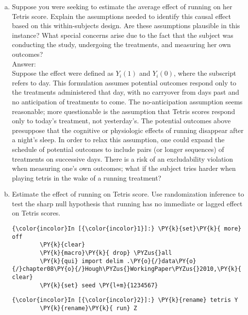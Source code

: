 \documentclass[11pt,notitlepage]{article}\usepackage[]{graphicx}\usepackage[]{color}
\makeatletter
\newenvironment{kframe}{%
 \def\at@end@of@kframe{}%
 \ifinner\ifhmode%
  \def\at@end@of@kframe{\end{minipage}}%
  \begin{minipage}{\columnwidth}%
 \fi\fi%
 \def\FrameCommand##1{\hskip\@totalleftmargin \hskip-\fboxsep
 \colorbox{shadecolor}{##1}\hskip-\fboxsep
     \hskip-\linewidth \hskip-\@totalleftmargin \hskip\columnwidth}%
 \MakeFramed {\advance\hsize-\width
   \@totalleftmargin\z@ \linewidth\hsize
   \@setminipage}}%
 {\par\unskip\endMakeFramed%
 \at@end@of@kframe}
\newenvironment{knitrout}{}{} %
\makeatother
\begin{document}
\begin{enumerate}[a)]
\item Suppose you were seeking to estimate the average effect of running on her Tetris score. Explain the assumptions needed to identify this causal effect based on this within-subjects design. Are these assumptions plausible in this instance? What special concerns arise due to the fact that the subject was conducting the study, undergoing the treatments, and measuring her own outcomes?\\
Answer:\\
Suppose the effect were defined as $Y_i (1)$ and $Y_i (0)$, where the subscript refers to day. This formulation assumes potential outcomes respond only to the treatments administered that day, with no carryover from days past and no anticipation of treatments to come. The no-anticipation assumption seems reasonable; more questionable is the assumption that Tetris scores respond only to today's treatment, not yesterday's. The potential outcomes above presuppose that the cognitive or physiologic effects of running disappear after a night's sleep.  In order to relax this assumption, one could expand the schedule of potential outcomes to include pairs (or longer sequences) of treatments on successive days. There is a risk of an excludability violation when measuring one's own outcomes; what if the subject tries harder when playing tetris in the wake of a running treatment?

\item Estimate the effect of running on Tetris score. Use randomization inference to test the sharp null hypothesis that running has no immediate or lagged effect on Tetris scores. \\



\begin{knitrout}
\color{fgcolor}\begin{kframe}
    \begin{Verbatim}[commandchars=\\\{\}]
{\color{incolor}In [{\color{incolor}1}]:} \PY{k}{set}\PY{k}{ more} off
        \PY{k}{clear}
        \PY{k}{macro}\PY{k}{ drop} \PYZus{}all
        \PY{k}{qui} import delim .\PY{o}{/}data\PY{o}{/}chapter08\PY{o}{/}Hough\PYZus{}WorkingPaper\PYZus{}2010,\PY{k}{ clear}
        \PY{k}{set} seed \PY{l+m}{1234567}
\end{Verbatim}

    \begin{Verbatim}[commandchars=\\\{\}]
{\color{incolor}In [{\color{incolor}2}]:} \PY{k}{rename} tetris Y
        \PY{k}{rename}\PY{k}{ run} Z
        

\end{Verbatim}
\end{kframe}
\end{knitrout}
\end{enumerate}
\end{document}
